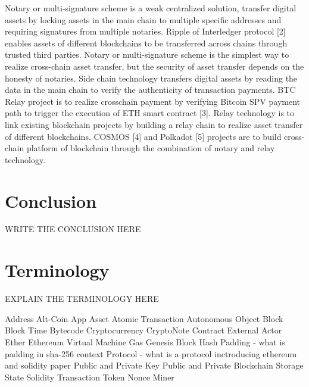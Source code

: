 Notary or multi-signature scheme is a weak centralized solution, transfer digital
assets by locking assets in the main chain to multiple specific addresses and requiring
signatures from multiple notaries. Ripple of Interledger protocol [2] enables assets of
different blockchains to be transferred across chains through trusted third parties. Notary
or multi-signature scheme is the simplest way to realize cross-chain asset transfer, but
the security of asset transfer depends on the honesty of notaries.
Side chain technology transfers digital assets by reading the data in the main chain
to verify the authenticity of transaction payments. BTC Relay project is to realize crosschain
payment by verifying Bitcoin SPV payment path to trigger the execution of ETH
smart contract [3].
Relay technology is to link existing blockchain projects by building a relay chain to
realize asset transfer of different blockchains. COSMOS [4] and Polkadot [5] projects
are to build cross-chain platform of blockchain through the combination of notary and
relay technology.

\chapter{Conclusion}
\label{ch:chapter07}
WRITE THE CONCLUSION HERE

\chapter{Terminology}
\label{ch:chapter08}
EXPLAIN THE TERMINOLOGY HERE

Address
Alt-Coin
App
Asset
Atomic Transaction
Autonomous Object
Block
Block Time
Bytecode
Cryptocurrency
CryptoNote
Contract 
External Actor
Ether
Ethereum Virtual Machine
Gas
Genesis Block
Hash
Padding - what is padding in sha-256 context
Protocol - what is a protocol inctroducing ethereum and solidity paper
Public and Private Key
Public and Private Blockchain
Storage State
Solidity
Transaction 
Token
Nonce
Miner








